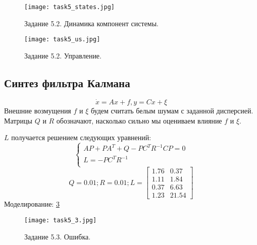 \begin{figure}[]
        \centering
        \texttt{[image: task5\_states.jpg]}
        \caption{Задание 5.2. Динамика компонент системы.}
        \label{fig:task5_states}
\end{figure}

\begin{figure}[]
        \centering
        \texttt{[image: task5\_us.jpg]}
        \caption{Задание 5.2. Управление.}
        \label{fig:task5_u}
\end{figure}


\subsection{Синтез фильтра Калмана}
\begin{equation}
    \dot{x} = Ax + f, y = Cx + \xi
\end{equation}
Внешние возмущения $f$ и $\xi$  будем считать белым шумам с заданной дисперсией.
Матрицы \(Q\) и \(R\) обозначают, насколько сильно мы оцениваем влияние \(f\) и \(\xi\).

\(L\) получается решением следующих уравнений:
\[
\begin{cases}
    A P + P A^T + Q - PC^TR^{-1}CP = 0\\
    L = -P C^T R^{-1}\\
\end{cases}
\]
\[Q = 0.01; R = 0.01; L = \begin{bmatrix}
    1.76 &  0.37\\
    1.11 &  1.84\\
    0.37 &  6.63\\
    1.23 &  21.54
  \end{bmatrix}\]
Моделирование: \ref{fig:task5_3}
\begin{figure}[]
        \centering
        \texttt{[image: task5\_3.jpg]}
        \caption{Задание 5.3. Ошибка.}
        \label{fig:task5_3}
\end{figure}


